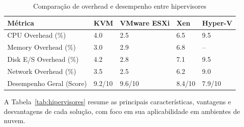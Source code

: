 \begin{table}[H]
    \centering
    \renewcommand{\arraystretch}{1.3}
    \caption{Comparação de overhead e desempenho entre hipervisores}
    \label{tab:overhead}
    \begin{tabular}{|l|l|l|l|l|}
        \hline
        \textbf{Métrica} & \textbf{KVM} & \textbf{VMware ESXi} & \textbf{Xen} & \textbf{Hyper-V} \\ \hline
        CPU Overhead (\%) & 4.0 & 2.5 & 6.5 & 9.5 \\ \hline
        Memory Overhead (\%) & 3.0 & 2.9 & 6.8 & -- \\ \hline
        Disk E/S Overhead (\%) & 4.2 & 2.8 & 7.1 & 9.5 \\ \hline
        Network Overhead (\%) & 3.5 & 2.5 & 6.2 & 9.0 \\ \hline
        Desempenho Geral (Score) & 9.2/10 & 9.6/10 & 8.4/10 & 7.9/10 \\ \hline
    \end{tabular}
\end{table}

A Tabela~\ref{tab:hipervisores} resume as principais características, vantagens e desvantagens de cada solução, com foco em sua aplicabilidade em ambientes de nuvem.

